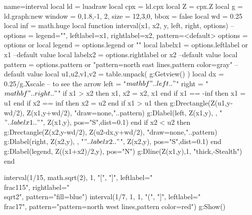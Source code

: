 \documentclass[border=5mm]{standalone}
\begin{document}
\begin{luadraw}{name=interval}
local ld = luadraw
local cpx = ld.cpx
local Z = cpx.Z
local g = ld.graph:new{ window = {0,1.8,-1, 2}, size = {12,3,0}, bbox = false }
local wd = 0.25
local inf = math.huge
local function interval(x1, x2, y, left, right, options)
-- options = { legend="", leftlabel=x1, rightlabel=x2, pattern=<default> }
    options = options or {}
    local legend = options.legend or ""
    local labelx1 = options.leftlabel or x1 --default value
    local labelx2 = options.rightlabel or x2 --default value
    local pattern = options.pattern or "pattern=north east lines,pattern color=gray" --default value
    local u1,u2,v1,v2 = table.unpack( g:Getview() )
    local dx = 0.25/g.Xscale -- to see the arrow
    left = "$\\mathbf{"..left.."}$"
    right = "$\\mathbf{"..right.."}$"
    if x1 > x2 then x1, x2 = x2, x1 end
    if x1 == -inf then x1 = u1 end
    if x2 == inf then x2 = u2 end
    if x1 > u1 then
        g:Drectangle(Z(u1,y-wd/2), Z(x1,y+wd/2), "draw=none,"..pattern)
        g:Dlabel(left, Z(x1,y), {}, "$"..labelx1.."$", Z(x1,y), {pos="S",dist=0.1})
    end
    if x2 < u2 then
        g:Drectangle(Z(x2,y-wd/2), Z(u2-dx,y+wd/2), "draw=none,"..pattern)
        g:Dlabel(right, Z(x2,y), {}, "$"..labelx2.."$", Z(x2,y), {pos="S",dist=0.1})
    end
    g:Dlabel(legend, Z((x1+x2)/2,y), {pos="N"})
    g:Dline({Z(x1,y),1}, "thick,-Stealth")
end

interval(1/15, math.sqrt(2), 1, "[", "]",
    {leftlabel="\\frac{1}{15}", rightlabel="\\sqrt{2}", pattern="fill=blue"})
interval(1/7, 1, 1, "(", "]",
    {leftlabel="\\frac{1}{7}", pattern="pattern=north west lines,pattern color=red"})
g:Show()
\end{luadraw}
\end{document}
